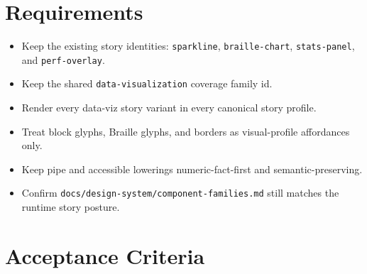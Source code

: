 \section{Requirements}\label{record-107-requirements}

\begin{itemize}
\tightlist
\item
  Keep the existing story identities: \texttt{s\allowbreak{}p\allowbreak{}a\allowbreak{}r\allowbreak{}k\allowbreak{}l\allowbreak{}i\allowbreak{}n\allowbreak{}e}, \texttt{b\allowbreak{}r\allowbreak{}a\allowbreak{}i\allowbreak{}l\allowbreak{}l\allowbreak{}e\allowbreak{}-\allowbreak{}c\allowbreak{}h\allowbreak{}a\allowbreak{}r\allowbreak{}t}, \texttt{s\allowbreak{}t\allowbreak{}a\allowbreak{}t\allowbreak{}s\allowbreak{}-\allowbreak{}p\allowbreak{}a\allowbreak{}n\allowbreak{}e\allowbreak{}l}, and \texttt{p\allowbreak{}e\allowbreak{}r\allowbreak{}f\allowbreak{}-\allowbreak{}o\allowbreak{}v\allowbreak{}e\allowbreak{}r\allowbreak{}l\allowbreak{}a\allowbreak{}y}.
\item
  Keep the shared \texttt{d\allowbreak{}a\allowbreak{}t\allowbreak{}a\allowbreak{}-\allowbreak{}v\allowbreak{}i\allowbreak{}s\allowbreak{}u\allowbreak{}a\allowbreak{}l\allowbreak{}i\allowbreak{}z\allowbreak{}a\allowbreak{}t\allowbreak{}i\allowbreak{}o\allowbreak{}n} coverage family id.
\item
  Render every data-viz story variant in every canonical story profile.
\item
  Treat block glyphs, Braille glyphs, and borders as visual-profile affordances only.
\item
  Keep pipe and accessible lowerings numeric-fact-first and semantic-preserving.
\item
  Confirm \texttt{d\allowbreak{}o\allowbreak{}c\allowbreak{}s\allowbreak{}/\allowbreak{}d\allowbreak{}e\allowbreak{}s\allowbreak{}i\allowbreak{}g\allowbreak{}n\allowbreak{}-\allowbreak{}s\allowbreak{}y\allowbreak{}s\allowbreak{}t\allowbreak{}e\allowbreak{}m\allowbreak{}/\allowbreak{}c\allowbreak{}o\allowbreak{}m\allowbreak{}p\allowbreak{}o\allowbreak{}n\allowbreak{}e\allowbreak{}n\allowbreak{}t\allowbreak{}-\allowbreak{}f\allowbreak{}a\allowbreak{}m\allowbreak{}i\allowbreak{}l\allowbreak{}i\allowbreak{}e\allowbreak{}s\allowbreak{}.\allowbreak{}m\allowbreak{}d} still matches the runtime story posture.
\end{itemize}

\section{Acceptance Criteria}\label{record-107-acceptance-criteria}

